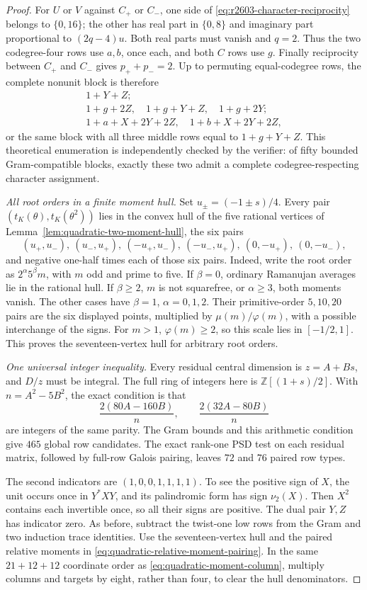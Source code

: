 \begin{proof}
For $U$ or $V$ against $C_+$ or $C_-$, one side of
\eqref{eq:r2603-character-reciprocity} belongs to $\{0,16\}$;
the other has real part in $\{0,8\}$ and imaginary part proportional
to $(2q-4)u$. Both real parts must vanish and $q=2$. Thus the two
codegree-four rows use $a,b$, once each, and both $C$ rows use $g$.
Finally reciprocity between $C_+$ and $C_-$ gives $p_++p_-=2$.
Up to permuting equal-codegree rows, the complete nonunit block is
therefore
\begin{gather*}
 1+Y+Z;\\
 1+g+2Z,\quad1+g+Y+Z,\quad1+g+2Y;\\
 1+a+X+2Y+2Z,\quad1+b+X+2Y+2Z,
\end{gather*}
or the same block with all three middle rows equal to $1+g+Y+Z$.
This theoretical enumeration is independently checked by the verifier:
of fifty bounded Gram-compatible blocks, exactly these two admit a
complete codegree-respecting character assignment.

\medskip\noindent\emph{All root orders in a finite moment hull.}
Set $u_\pm=(-1\pm s)/4$. Every pair
$(t_K(\theta),t_K(\theta^2))$ lies in the convex hull of the five
rational vertices of Lemma~\ref{lem:quadratic-two-moment-hull}, the six
pairs
\[
 (u_+,u_-),\ (u_-,u_+),\ (-u_+,u_-),\ (-u_-,u_+),\
 (0,-u_+),\ (0,-u_-),
\]
and negative one-half times each of those six pairs.
Indeed, write the root order as $2^\alpha5^\beta m$, with $m$ odd
and prime to five. If $\beta=0$, ordinary Ramanujan averages lie in
the rational hull. If $\beta\geq2$, $m$ is not squarefree, or
$\alpha\geq3$, both moments vanish. The other cases have
$\beta=1$, $\alpha=0,1,2$. Their primitive-order $5,10,20$ pairs
are the six displayed points, multiplied by $\mu(m)/\varphi(m)$,
with a possible interchange of the signs. For $m>1$,
$\varphi(m)\geq2$, so this scale lies in $[-1/2,1]$.
This proves the seventeen-vertex hull for arbitrary root orders.

\medskip\noindent\emph{One universal integer inequality.}
Every residual central dimension is $z=A+Bs$, and $D/z$ must be
integral. The full ring of integers here is
$\mathbb Z[(1+s)/2]$. With $n=A^2-5B^2$, the exact condition is that
\[
 \frac{2(80A-160B)}n,\qquad\frac{2(32A-80B)}n
\]
are integers of the same parity. The Gram bounds and this arithmetic
condition give $465$ global row candidates. The exact rank-one PSD
test on each residual matrix, followed by full-row Galois pairing,
leaves $72$ and $76$ paired row types.

The second indicators are $(1,0,0,1,1,1,1)$. To see the positive
sign of $X$, the unit occurs once in $Y^*XY$, and its palindromic
form has sign $\nu_2(X)$. Then $X^2$ contains each invertible once,
so all their signs are positive. The dual pair $Y,Z$ has indicator
zero. As before, subtract the twist-one low rows from the Gram and
two induction trace identities. Use the seventeen-vertex hull and
the paired relative moments in
\eqref{eq:quadratic-relative-moment-pairing}. In the same
$21+12+12$ coordinate order as \eqref{eq:quadratic-moment-column},
multiply columns and targets by eight, rather than four, to clear
the hull denominators.


\end{proof}

